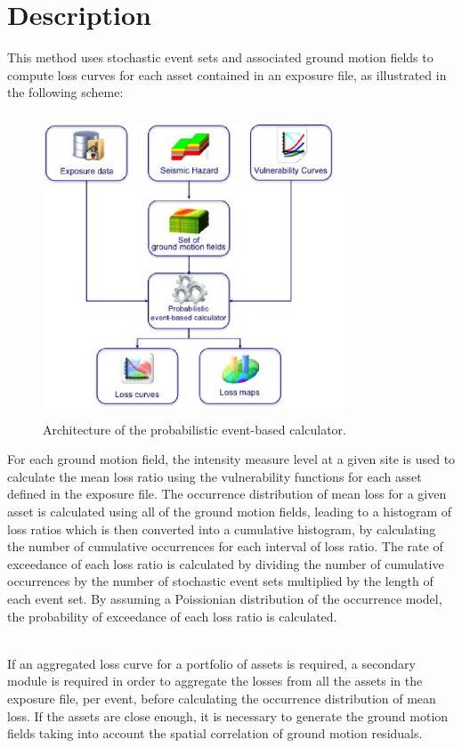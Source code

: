 \section{Description}
This method uses stochastic event sets and associated ground motion fields to compute loss curves for each asset contained in an exposure file, as illustrated in the following scheme:  

\begin{figure}[ht]
\centering
\includegraphics[width=9cm,height=9cm]{./Figures/Part_Risk/Scheme_Prob_calc.eps}
\caption{Architecture of the probabilistic event-based calculator.}
\label{fig:Scheme_Prob_calc}
\end{figure}

For each ground motion field, the intensity measure level at a given site is used to calculate the mean loss ratio using the vulnerability functions for each asset defined in the exposure file. The occurrence distribution of mean loss for a given asset is calculated using all of the ground motion fields, leading to a histogram of loss ratios which is then converted into a cumulative histogram, by calculating the number of cumulative occurrences for each interval of loss ratio. The rate of exceedance of each loss ratio is calculated by dividing the number of cumulative occurrences by the number of stochastic event sets multiplied by the length of each event set. By assuming a Poissionian distribution of the occurrence model, the probability of exceedance of each loss ratio is calculated. 
 
\hfill \\

If an aggregated loss curve for a portfolio of assets is required, a secondary module is required in order to aggregate the losses from all the assets in the exposure file, per event, before calculating the occurrence distribution of mean loss. If the assets are close enough, it is necessary to generate the ground motion fields taking into account the spatial correlation of ground motion residuals. 

